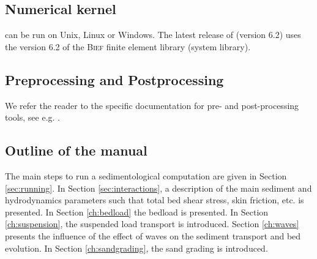 \subsection{Numerical kernel}
\sisyphe can be run on Unix, Linux or Windows. The latest release of \sisyphe (version 6.2) uses the version 6.2 of the {\scshape Bief} finite element library (\tel system library). 

\subsection{Preprocessing and Postprocessing}
We refer the reader to the specific documentation for pre- and post-processing tools, see e.g. \cite{}.

\subsection{Outline of the manual}
The main steps to run a sedimentological computation are given in Section \ref{sec:running}. 
In Section \ref{sec:interactions}, a description of the main sediment and hydrodynamics parameters such that total bed shear stress, skin friction, etc. is presented. 
In Section \ref{ch:bedload} the bedload is presented. In Section \ref{ch:suspension}, the suspended load transport is introduced. Section \ref{ch:waves} presents the influence of the effect of waves on the sediment transport and bed evolution. In Section \ref{ch:sandgrading}, the sand grading is introduced.
